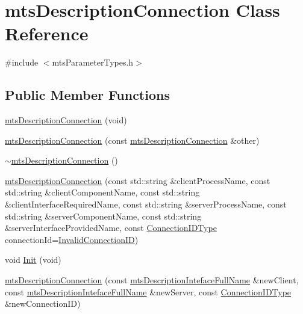 \hypertarget{classmts_description_connection}{}\section{mts\+Description\+Connection Class Reference}
\label{classmts_description_connection}


{\ttfamily \#include $<$mts\+Parameter\+Types.\+h$>$}

\subsection*{Public Member Functions}
\begin{DoxyCompactItemize}
\item 
\hyperlink{classmts_description_connection_ab51d91468f65fbe0b6046a71c839f2a4}{mts\+Description\+Connection} (void)
\item 
\hyperlink{classmts_description_connection_a6896ac7072537d7dbf998beac7288326}{mts\+Description\+Connection} (const \hyperlink{classmts_description_connection}{mts\+Description\+Connection} \&other)
\item 
\hyperlink{classmts_description_connection_a01b7ca5d77c59e945b815b69a3cbed87}{$\sim$mts\+Description\+Connection} ()
\item 
\hyperlink{classmts_description_connection_ab772dfaa64efa020fe1fafcbffe0374d}{mts\+Description\+Connection} (const std\+::string \&client\+Process\+Name, const std\+::string \&client\+Component\+Name, const std\+::string \&client\+Interface\+Required\+Name, const std\+::string \&server\+Process\+Name, const std\+::string \&server\+Component\+Name, const std\+::string \&server\+Interface\+Provided\+Name, const \hyperlink{mts_forward_declarations_8h_ad3543bb11742e1766374ec96016d6547}{Connection\+I\+D\+Type} connection\+Id=\hyperlink{mts_forward_declarations_8h_afa0f9196284a3cea6a91094a0f45209e}{Invalid\+Connection\+I\+D})
\item 
void \hyperlink{classmts_description_connection_a9baec37ea80d73f56a523c4621fb21fe}{Init} (void)
\item 
\hyperlink{classmts_description_connection_ad0d50b7d9f4c700eb95dbf09ecf813b1}{mts\+Description\+Connection} (const \hyperlink{classmts_description_inteface_full_name}{mts\+Description\+Inteface\+Full\+Name} \&new\+Client, const \hyperlink{classmts_description_inteface_full_name}{mts\+Description\+Inteface\+Full\+Name} \&new\+Server, const \hyperlink{mts_forward_declarations_8h_ad3543bb11742e1766374ec96016d6547}{Connection\+I\+D\+Type} \&new\+Connection\+I\+D)

\end{DoxyCompactItemize}
